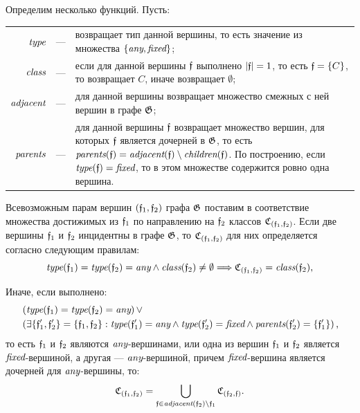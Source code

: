 Определим несколько функций. Пусть:

{\centering
\begin{tabularx}{\textwidth}{rcX}
    $\textit{type}$ & --- & возвращает тип данной вершины, то есть значение из множества $\{\textit{any}, \textit{fixed}\}$; \\
   $\textit{class}$ & --- & если для данной вершины $\mathfrak{f}$ выполнено $|\mathfrak{f}| = 1$, то есть $\mathfrak{f} = \{C\}$, то возвращает $C$, иначе возвращает $\emptyset$; \\
$\textit{adjacent}$ & --- & для данной вершины возвращает множество смежных с ней вершин в графе $\mathfrak{G}$; \\
 $\textit{parents}$ & --- & для данной вершины $\mathfrak{f}$ возвращает множество вершин, для которых $\mathfrak{f}$ является дочерней в $\mathfrak{G}$, то есть $\textit{parents}(\mathfrak{f}) = \textit{adjacent}(\mathfrak{f}) \setminus \textit{children}(\mathfrak{f})$. По построению, если $\textit{type}(\mathfrak{f}) = \textit{fixed}$, то в этом множестве содержится ровно одна вершина. \\
\end{tabularx}}

Всевозможным парам вершин $(\mathfrak{f}_1, \mathfrak{f}_2)$ графа $\mathfrak{G}$ поставим в соответствие множества достижимых из $\mathfrak{f}_1$ по направлению на $\mathfrak{f}_2$ классов $\mathfrak{C}_{(\mathfrak{f}_1, \mathfrak{f}_2)}$. Если две вершины $\mathfrak{f}_1$ и $\mathfrak{f}_2$ инцидентны в графе $\mathfrak{G}$, то $\mathfrak{C}_{(\mathfrak{f}_1, \mathfrak{f}_2)}$ для них определяется согласно следующим правилам:
\begin{equation}\label{eq:cset_for_class}
\textit{type}(\mathfrak{f}_1) = \textit{type}(\mathfrak{f}_2) = \textit{any} \wedge \textit{class}(\mathfrak{f}_2) \ne \emptyset \Longrightarrow \mathfrak{C}_{(\mathfrak{f}_1, \mathfrak{f}_2)} = \textit{class}(\mathfrak{f}_2) \text{,}
\end{equation}

Иначе, если выполнено:
\begin{equation}\label{eq:cset_for_rest_cond}
\begin{aligned}
&\left( \textit{type}(\mathfrak{f}_1) = \textit{type}(\mathfrak{f}_2) = \textit{any} \right) \vee \\
&\left( \exists \{\mathfrak{f}'_1, \mathfrak{f}'_2\} = \{\mathfrak{f}_1, \mathfrak{f}_2\}: \textit{type}(\mathfrak{f}'_1) = \textit{any} \wedge \textit{type}(\mathfrak{f}'_2) = \textit{fixed} \wedge \textit{parents}(\mathfrak{f}'_2) = \{\mathfrak{f}'_1\} \right) \text{,}
\end{aligned}
\end{equation}
то есть $\mathfrak{f}_1$ и $\mathfrak{f}_2$ являются $\textit{any}$-вершинами, или одна из вершин $\mathfrak{f}_1$ и $\mathfrak{f}_2$ является $\textit{fixed}$-вершиной, а другая --- $\textit{any}$-вершиной, причем $\textit{fixed}$-вершина является дочерней для $\textit{any}$-вершины, то:
\begin{equation}\label{eq:cset_for_rest}
\mathfrak{C}_{(\mathfrak{f}_1, \mathfrak{f}_2)} = \bigcup_{\mathfrak{f} \in \textit{adjacent}(\mathfrak{f}_2) \setminus \mathfrak{f}_1} \mathfrak{C}_{(\mathfrak{f}_2, \mathfrak{f})} \text{.}
\end{equation}

